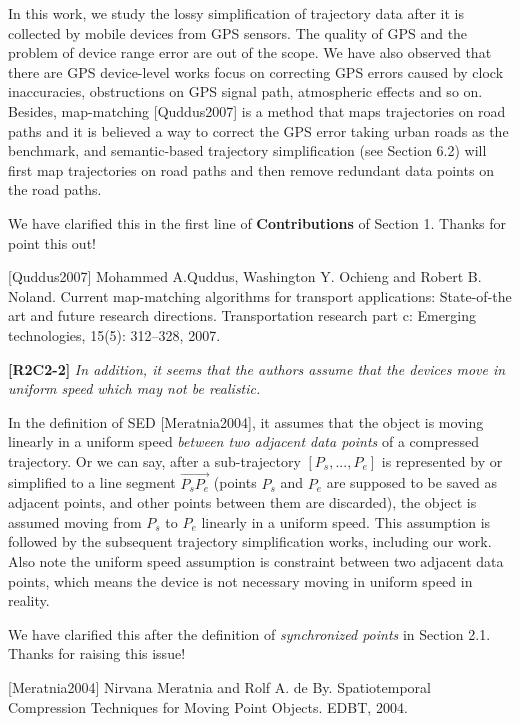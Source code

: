 \documentclass{letter}
\begin{document}
In this work, we study the lossy simplification of trajectory data after it is collected by mobile devices from GPS sensors. The quality of GPS and the problem of device range error are out of the scope. 
%
We have also observed that there are GPS device-level works focus on correcting GPS errors caused by clock inaccuracies, obstructions on GPS signal path, atmospheric effects and so on. Besides, map-matching [Quddus2007] is a method that maps trajectories on road paths and it is believed a way to correct the GPS error taking urban roads as the benchmark, and semantic-based trajectory simplification (see Section 6.2) will first map trajectories on road paths and then remove redundant data points on the road paths.

We have clarified this in the first line of \textbf{Contributions} of Section 1. Thanks for point this out!


[Quddus2007] Mohammed A.Quddus, Washington Y. Ochieng and Robert B. Noland. Current map-matching algorithms for transport applications: State-of-the art and future research directions. {Transportation research part c: Emerging technologies}, 15(5): 312--328, 2007.

\textbf{[R2C2-2]} \emph{In addition, it seems that the authors assume that the devices move in uniform speed which may not be realistic.}

In the definition of SED [Meratnia2004], it assumes that the object is moving linearly in a uniform speed \textit{between two adjacent data points} of a compressed trajectory. Or we can say, after a sub-trajectory $[P_s, ..., P_e]$ is represented by or simplified to a line segment $\overrightarrow{P_sP_e}$ (points $P_s$ and $P_e$ are supposed to be saved as adjacent points, and other points between them are discarded), the object is assumed moving from $P_s$ to $P_e$ linearly in a uniform speed. This assumption is followed by the subsequent trajectory simplification works, including our work. Also note the uniform speed assumption is constraint between two adjacent data points, which means the device is not necessary moving in uniform speed in reality.

We have clarified this after the definition of \emph{synchronized points} in Section 2.1. Thanks for raising this issue!

[Meratnia2004] Nirvana Meratnia and Rolf A. de By. Spatiotemporal Compression Techniques for Moving Point Objects. EDBT, 2004.
\end{document}

